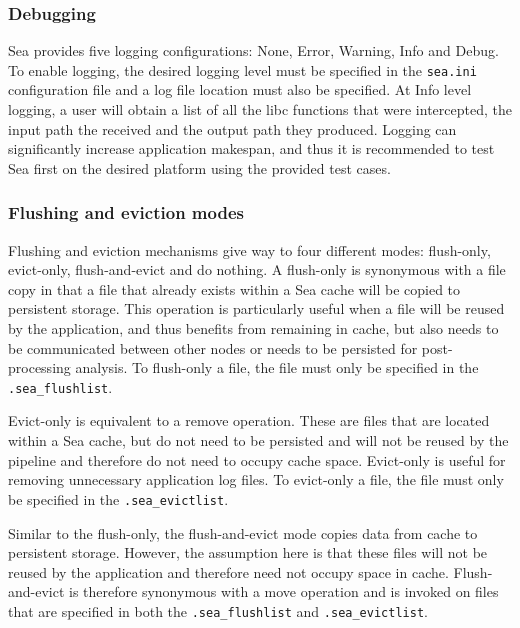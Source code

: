 \subsubsection{Debugging}
Sea provides five logging configurations: None, Error, Warning, Info and
Debug. To enable logging, the desired logging level must be specified in the
\texttt{sea.ini} configuration file and a log file location must also be specified.
At Info level logging, a user will obtain a list of all the libc functions that were
intercepted, the input path the received and the output path they produced.
Logging can significantly increase application makespan, and thus it is recommended
to test Sea first on the desired platform using the provided test cases.



\subsubsection{Flushing and eviction modes}
Flushing and eviction mechanisms give way to four different modes: flush-only,
evict-only, flush-and-evict and do nothing. A flush-only is synonymous with a file
copy in that a file that already exists within a Sea cache will be copied to
persistent storage. This operation is particularly useful when a file will be
reused by the application, and thus benefits from remaining in cache, but also
needs to be communicated between other nodes or needs to be persisted for
post-processing analysis. To flush-only a file, the file must only be specified in the
\texttt{.sea\_flushlist}.

Evict-only is equivalent to a remove operation. These are files that are located within a Sea cache,
but do not need to be persisted and will not be reused by the pipeline and therefore do not need to occupy
cache space. Evict-only is useful 
for removing unnecessary application log files. To evict-only a file, the file must only be specified in 
the \texttt{.sea\_evictlist}.

Similar to the flush-only, the flush-and-evict mode copies data from cache to persistent storage.
However, the assumption here is that these files will not be reused by the application and therefore 
need not occupy space in cache. Flush-and-evict is therefore synonymous with a move operation and is
invoked on files that are specified in both the \texttt{.sea\_flushlist} and \texttt{.sea\_evictlist}.


